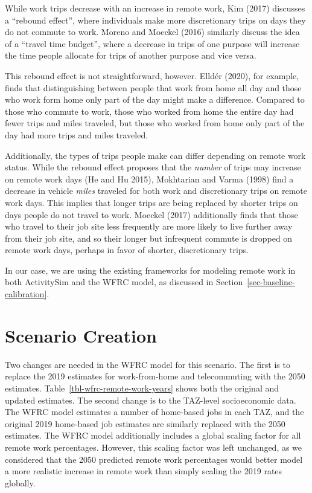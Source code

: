 \documentclass[fancy, oneside, mastersfancy, ms]{byuthesis}
\begin{document}
While work trips decrease with an increase in remote work, Kim (2017)
discusses a ``rebound effect'', where individuals make more
discretionary trips on days they do not commute to work. Moreno and
Moeckel (2016) similarly discuss the idea of a ``travel time budget'',
where a decrease in trips of one purpose will increase the time people
allocate for trips of another purpose and vice versa.

This rebound effect is not straightforward, however. Elldér (2020), for
example, finds that distinguishing between people that work from home
all day and those who work form home only part of the day might make a
difference. Compared to those who commute to work, those who worked from
home the entire day had fewer trips and miles traveled, but those who
worked from home only part of the day had more trips and miles traveled.

Additionally, the types of trips people make can differ depending on
remote work status. While the rebound effect proposes that the
\emph{number} of trips may increase on remote work days (He and Hu
2015), Mokhtarian and Varma (1998) find a decrease in vehicle
\emph{miles} traveled for both work and discretionary trips on remote
work days. This implies that longer trips are being replaced by shorter
trips on days people do not travel to work. Moeckel (2017) additionally
finds that those who travel to their job site less frequently are more
likely to live further away from their job site, and so their longer but
infrequent commute is dropped on remote work days, perhaps in favor of
shorter, discretionary trips.

In our case, we are using the existing frameworks for modeling remote
work in both ActivitySim and the WFRC model, as discussed in
Section~\ref{sec-baseline-calibration}.

\section{Scenario Creation}\label{scenario-creation-2}

Two changes are needed in the WFRC model for this scenario. The first is
to replace the 2019 estimates for work-from-home and telecommuting with
the 2050 estimates. Table~\ref{tbl-wfrc-remote-work-years} shows both
the original and updated estimates. The second change is to the
TAZ-level socioeconomic data. The WFRC model estimates a number of
home-based jobs in each TAZ, and the original 2019 home-based job
estimates are similarly replaced with the 2050 estimates. The WFRC model
additionally includes a global scaling factor for all remote work
percentages. However, this scaling factor was left unchanged, as we
considered that the 2050 predicted remote work percentages would better
model a more realistic increase in remote work than simply scaling the
2019 rates globally.
\end{document}

